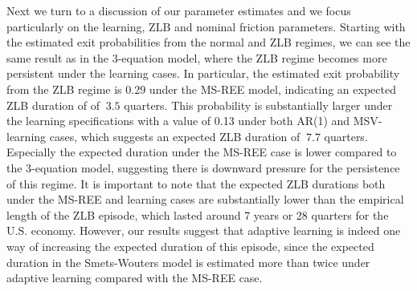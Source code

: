 \documentclass[12pt,reqno]{article}
\numberwithin{equation}{section}
\begin{document}
Next we turn to a discussion of our parameter estimates and we focus particularly on the learning, ZLB and nominal friction parameters. Starting with the estimated exit probabilities from the normal and ZLB regimes, we can see the same result as in the 3-equation model, where the ZLB regime becomes more persistent under the learning cases. In particular, the estimated exit probability from the ZLB regime is 0.29 under the MS-REE model, indicating an expected ZLB duration of of $~3.5$ quarters. This probability is substantially larger under the learning specifications with a value of 0.13 under both AR(1) and MSV-learning cases, which suggests an expected ZLB duration of $~7.7$ quarters. Especially the expected duration under the MS-REE case is lower compared to the 3-equation model, suggesting there is downward pressure for the persistence of this regime. It is important to note that the expected ZLB durations both under the MS-REE and learning cases are substantially lower than the empirical length of the ZLB episode, which lasted around 7 years or 28 quarters for the U.S. economy. However, our results suggest that adaptive learning is indeed one way of increasing the expected duration of this episode, since the expected duration in the Smets-Wouters model is estimated more than twice under adaptive learning compared with the MS-REE case. \\
\noindent
\end{document}
